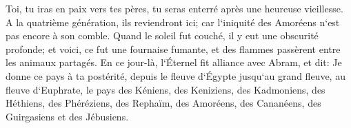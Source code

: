 \verse Toi, tu iras en paix vers tes pères, tu seras enterré après une heureuse vieillesse. 
\verse A la quatrième génération, ils reviendront ici; car l`iniquité des Amoréens n`est pas encore à son comble. 
\verse Quand le soleil fut couché, il y eut une obscurité profonde; et voici, ce fut une fournaise fumante, et des flammes passèrent entre les animaux partagés. 
\verse En ce jour-là, l`Éternel fit alliance avec Abram, et dit: Je donne ce pays à ta postérité, depuis le fleuve d`Égypte jusqu`au grand fleuve, au fleuve d`Euphrate, 
\verse le pays des Kéniens, des Keniziens, des Kadmoniens, 
\verse des Héthiens, des Phéréziens, des Rephaïm, 
\verse des Amoréens, des Cananéens, des Guirgasiens et des Jébusiens. 


